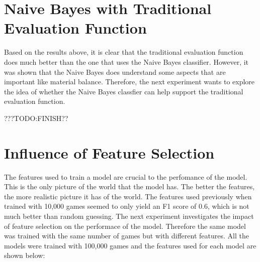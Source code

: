 


\section{Naive Bayes with Traditional Evaluation Function}

Based on the results above, it is clear that the traditional evaluation function does much better than the one that uses the Naive Bayes classifier. However, it was shown that the Naive Bayes does understand some aspects that are important like material balance. Therefore, the next experiment wants to explore the idea of whether the Naive Bayes classfier can help support the traditional evaluation function. 

???TODO:FINISH??

\section{Influence of Feature Selection}

The features used to train a model are crucial to the perfomance of the model. This is the only picture of the world that the model has. The better the features, the more realistic picture it has of the world. The features used previously when trained with 10,000 games seemed to only yield an F1 score of 0.6, which is not much better than random guessing. The next experiment investigates the impact of feature selection on the performace of the model.
Therefore the same model was trained with the same number of games but with different features. 
All the models were trained with 100,000 games and the features used for each model are shown below:

